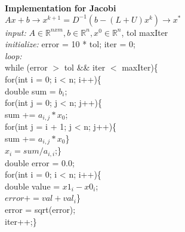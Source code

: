 \documentclass[10pt, AMS Euler]{article}
\newcommand{\R}{\mathbb{R}}
\begin{document}
\textbf{Implementation for Jacobi}\\
$Ax + b \rightarrow x^{k+1} = D^{-1}(b - (L + U)x^k) \rightarrow x^*$\\
\textit{input:} $A \in \R^{n x m}, b \in \R^n, x^0 \in \R^n$, tol maxIter\\
\textit{initialize:} error = 10 * tol; iter = 0;\\
\textit{loop:}\\
while (error $>$ tol \&\& iter $<$ maxIter)\{\\
for(int i = 0; i < n; i++)\{\\
double sum = $b_i$;\\
for(int j = 0; j < n; j++)\{\\
sum += $a_{i,j} * x_0$;\\
for(int j = i + 1; j < n; j++)\{\\
sum += $a_{i,j} * x_0$\}\\
$x_i = sum / a_{i,i}$;\}\\
double error = 0.0;\\
for(int i = 0; i < n; i++)\{\\
double value = $x1_i - x0_i$;\\
$error += val + val_i$\}\\
error = sqrt(error);\\
iter++;\}\\



\noindent \underline{\hspace{3in}}\\
\end{document}
